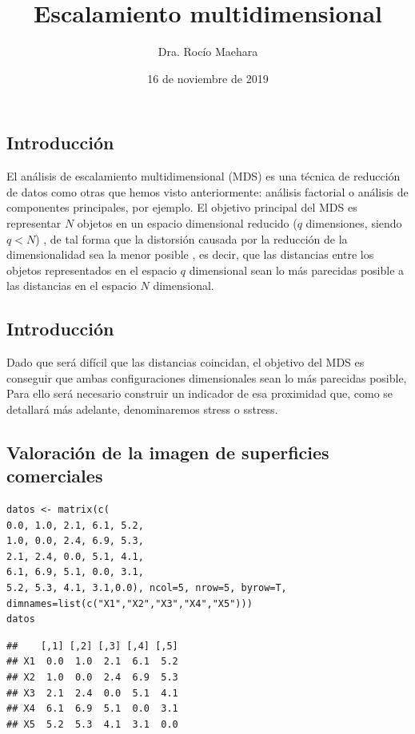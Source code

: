 \documentclass[]{article}
\title{\textbf{Escalamiento multidimensional}}
\author{Dra. Rocío Maehara}
\date{16 de noviembre de 2019}
\begin{document}
\maketitle

\subsection{Introducción}\label{introducciuxf3n}

El análisis de escalamiento multidimensional (MDS) es una { técnica de
reducción de datos } como otras que hemos visto anteriormente: análisis
factorial o análisis de componentes principales, por ejemplo. El {
objetivo principal } del MDS es {representar \(N\) objetos en un espacio
dimensional reducido (\(q\) dimensiones, siendo \(q < N\)) }, de tal
forma que la { distorsión causada por la reducción de la dimensionalidad
sea la menor posible }, es decir, que las distancias entre los objetos
representados en el espacio \(q\) dimensional sean lo más parecidas
posible a las distancias en el espacio \(N\) dimensional.

\subsection{Introducción}\label{introducciuxf3n-1}

Dado que será { difícil que las distancias coincidan}, el objetivo del
MDS es {conseguir que ambas configuraciones dimensionales sean lo más
parecidas posible}, Para ello será necesario construir un {indicador de
esa proximidad } que, como se detallará más adelante, denominaremos
{stress o sstress}.

\subsection{Valoración de la imagen de superficies
comerciales}\label{valoraciuxf3n-de-la-imagen-de-superficies-comerciales}

\hypertarget{left}{}
\begin{verbatim}
datos <- matrix(c(
0.0, 1.0, 2.1, 6.1, 5.2,
1.0, 0.0, 2.4, 6.9, 5.3,
2.1, 2.4, 0.0, 5.1, 4.1,
6.1, 6.9, 5.1, 0.0, 3.1,
5.2, 5.3, 4.1, 3.1,0.0), ncol=5, nrow=5, byrow=T,
dimnames=list(c("X1","X2","X3","X4","X5")))
datos
\end{verbatim}

\begin{verbatim}
##    [,1] [,2] [,3] [,4] [,5]
## X1  0.0  1.0  2.1  6.1  5.2
## X2  1.0  0.0  2.4  6.9  5.3
## X3  2.1  2.4  0.0  5.1  4.1
## X4  6.1  6.9  5.1  0.0  3.1
## X5  5.2  5.3  4.1  3.1  0.0
\end{verbatim}
\end{document}
